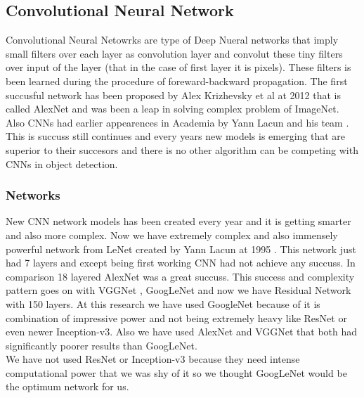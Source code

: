 \documentclass[10pt,twocolumn,letterpaper]{article}
\begin{document}
\subsection{Convolutional Neural Network}
Convolutional Neural Netowrks are type of Deep Nueral networks that imply small filters over each layer as convolution layer and convolut these tiny filters over input of the layer (that in the case of first layer it is pixels). These filters is been learned during the procedure of foreward-backward propagation. The first succusful network has been proposed by Alex Krizhevsky et al \cite{CNN} at 2012 that is called AlexNet and was been a leap in solving complex problem of ImageNet. Also CNNs had earlier appearences in Academia by Yann Lacun and his team \cite{LeNet}. This is succuss still continues and every years new models is emerging that are superior to their succesors and there is no other algorithm can be competing with CNNs in object detection. 


\subsubsection{Networks}
New CNN network models has been created every year and it is getting smarter and also more complex. Now we have extremely complex and also immensely powerful network from LeNet created by Yann Lacun at 1995 \cite{LeNet}. This network just had 7 layers and except being first working CNN had not achieve any succuss. In comparison 18 layered AlexNet \cite{alexnet} was a great succuss. This success and complexity pattern goes on with VGGNet \cite{VGGNet}, GoogLeNet \cite{GoogLeNet} and now we have Residual Network \cite{ResNet} with 150 layers. At this research we have used GoogleNet because of it is combination of impressive power and not being extremely heavy like ResNet or even newer Inception-v3. Also we have used AlexNet and VGGNet that both had significantly poorer results than GoogLeNet. \\
We have not used ResNet or Inception-v3 because they need intense computational power that we was shy of it so we thought GoogLeNet would be the optimum network for us. 
\end{document}

